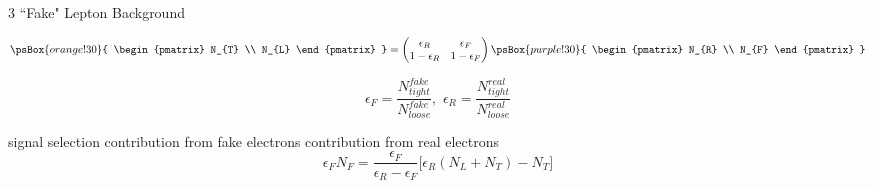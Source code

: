 \documentclass[final,hyperref={pdfpagelabels=false}]{beamer}
\begin{document}
\begin{frame}[t]
\begin{block}{3 ``Fake" Lepton Background}
		\vspace{5pt}
		\begin{minipage}{.5\linewidth}
			\begin{equation*}
			\psBox{orange!30}{
  		  		\begin{pmatrix} 
				N_{T} \\
				N_{L} 
				\end{pmatrix}
				}=
				\begin{pmatrix}
				\epsilon_{R} & \epsilon_{F} \\
				1 - \epsilon_{R} & 1 - \epsilon_{F}
				\end{pmatrix}
				\psBox{purple!30}{
				\begin{pmatrix}
				N_{R} \\
				N_{F}
				\end{pmatrix}
				}
 		 	\end{equation*} 
		\end{minipage}\hfill
		\begin{minipage}{.4\linewidth}
			\begin{equation*}
			\boxed{
 				\epsilon_{F} = \frac{N^{fake}_{tight}}{N^{fake}_{loose}}, \, \,  
 				\epsilon_{R} = \frac{N^{real}_{tight}}{N^{real}_{loose}}
 				}
  			\end{equation*}
		\end{minipage}
		
\vspace{-5pt}
	{\footnotesize \phantom{x}\hspace{27ex} {\color{ATLASBlue}signal selection} \hspace{5ex} {\color{red}contribution from fake electrons} }
	\vspace{-9pt}
	\vspace{-25pt}
	{\footnotesize \phantom{x}\hspace{33ex} {\color{green}contribution from real electrons} }
\vspace{5pt}
\vspace{10pt}
		\begin{equation*}
			\epsilon_{F}N_{F} = \frac{\epsilon_{F}}{\epsilon_{R} - \epsilon_{F}} \big[ \epsilon_{R}(N_{L} + N_{T}) - N_{T} \big]	
		\end{equation*}
		

\end{block}
\end{frame}
\end{document}

